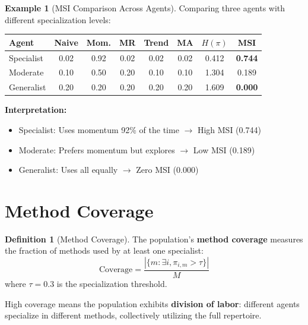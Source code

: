 \documentclass[11pt,a4paper]{article}
\theoremstyle{definition}
\newtheorem{definition}{Definition}[section]
\newtheorem{example}{Example}[section]
\theoremstyle{plain}
\begin{document}
\begin{example}[MSI Comparison Across Agents]
Comparing three agents with different specialization levels:

\begin{center}
\begin{tabular}{l|ccccc|c|c}
\toprule
Agent & Naive & Mom. & MR & Trend & MA & $H(\pi)$ & MSI \\
\midrule
Specialist & 0.02 & 0.92 & 0.02 & 0.02 & 0.02 & 0.412 & \textbf{0.744} \\
Moderate & 0.10 & 0.50 & 0.20 & 0.10 & 0.10 & 1.304 & 0.189 \\
Generalist & 0.20 & 0.20 & 0.20 & 0.20 & 0.20 & 1.609 & \textbf{0.000} \\
\bottomrule
\end{tabular}
\end{center}

\textbf{Interpretation:}
\begin{itemize}
    \item Specialist: Uses momentum 92\% of the time $\rightarrow$ High MSI (0.744)
    \item Moderate: Prefers momentum but explores $\rightarrow$ Low MSI (0.189)
    \item Generalist: Uses all equally $\rightarrow$ Zero MSI (0.000)
\end{itemize}
\end{example}

\section{Method Coverage}

\begin{definition}[Method Coverage]
The population's \textbf{method coverage} measures the fraction of methods used by at least one specialist:
\begin{equation}
\text{Coverage} = \frac{|\{m : \exists i, \pi_{i,m} > \tau\}|}{M}
\end{equation}
where $\tau = 0.3$ is the specialization threshold.
\end{definition}

\begin{intuition}
High coverage means the population exhibits \textbf{division of labor}: different agents specialize in different methods, collectively utilizing the full repertoire.
\end{intuition}
\end{document}
